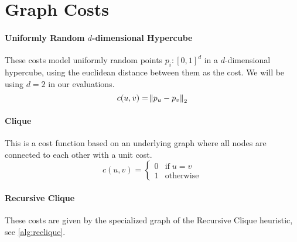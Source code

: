 \documentclass[a4paper, oneside]{discothesis}
\begin{document}
\section{Graph Costs}
\label{graph-costs}


\paragraph{Uniformly Random $d$-dimensional Hypercube}\label{costs:cube} These costs model uniformly random points $p_i:[0,1]^d$ in a $d$-dimensional hypercube, using the euclidean distance between them as the cost. We will be using $d=2$ in our evaluations.
\begin{equation}
c(u,v)=\norm{p_u-p_v}_2
\end{equation}

\paragraph{Clique}\label{costs:clique} This is a cost function based on an underlying graph where all nodes are connected to each other with a unit cost.
\begin{equation}
c(u,v)=
\begin{cases}
0 & \text{if}\;u=v \\
1 & \text{otherwise}
\end{cases}
\end{equation}


\paragraph{Recursive Clique} These costs are given by the specialized graph of the Recursive Clique heuristic, see \autoref{alg:reclique}.
\end{document}
